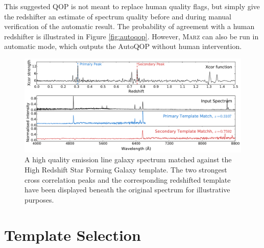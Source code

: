 \documentclass[5p]{elsarticle}
\newcommand{\marz}{\textsc{Marz}}
\begin{document}
This suggested QOP is not meant to replace human quality flags, but simply give the redshifter an estimate of spectrum quality before and during manual verification of the automatic result. The probability of agreement with a human redshifter is illustrated in Figure \ref{fig:autoqop}.  However, \marz{} can also be run in automatic mode, which outputs the AutoQOP without human intervention.






\begin{figure}[t]
\centering
\includegraphics[width=\textwidth]{xcors.pdf}
\caption{A high quality emission line galaxy spectrum matched against the High Redshift Star Forming Galaxy template. The two strongest cross correlation peaks and the corresponding redshifted template have been displayed beneath the original spectrum for illustrative purposes.}
\label{fig:xcors}
\end{figure}







\section{Template Selection} \label{sec:templates}
\end{document}
